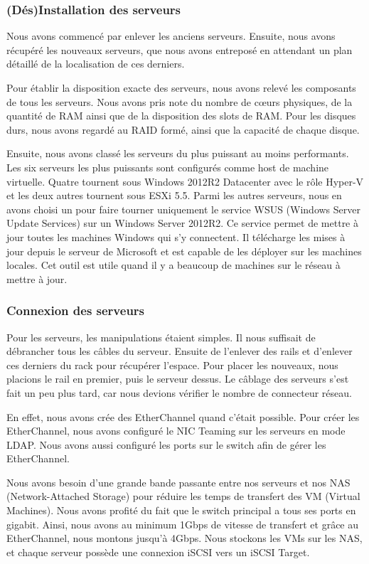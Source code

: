 \subsubsection{(Dés)Installation des serveurs}
Nous avons commencé par enlever les anciens serveurs.
Ensuite, nous avons récupéré les nouveaux serveurs, que nous avons entreposé en attendant un plan détaillé de la localisation de ces derniers.

Pour établir la disposition exacte des serveurs, nous avons relevé les composants de tous les serveurs.
Nous avons pris note du nombre de cœurs physiques, de la quantité de RAM ainsi que de la disposition des slots de RAM.
Pour les disques durs, nous avons regardé au RAID formé, ainsi que la capacité de chaque disque.

Ensuite, nous avons classé les serveurs du plus puissant au moins performants. 
Les six serveurs les plus puissants sont configurés comme host de machine virtuelle. 
Quatre tournent sous Windows 2012R2 Datacenter avec le rôle Hyper-V et les deux autres tournent sous ESXi 5.5.
Parmi les autres serveurs, nous en avons choisi un pour faire tourner uniquement le service WSUS (Windows Server Update Services) sur un Windows Server 2012R2. 
Ce service permet de mettre à jour toutes les machines Windows qui s'y connectent.
Il télécharge les mises à jour depuis le serveur de Microsoft et est capable de les déployer sur les machines locales.
Cet outil est utile quand il y a beaucoup de machines sur le réseau à mettre à jour. 

\subsubsection{Connexion des serveurs}
Pour les serveurs, les manipulations étaient simples. 
Il nous suffisait de débrancher tous les câbles du serveur.
Ensuite de l'enlever des rails et d'enlever ces derniers du rack pour récupérer l'espace.
Pour placer les nouveaux, nous placions le rail en premier, puis le serveur dessus.
Le câblage des serveurs s'est fait un peu plus tard, car nous devions vérifier le nombre de connecteur réseau. 

En effet, nous avons crée des EtherChannel quand c'était possible.
Pour créer les EtherChannel, nous avons configuré le NIC Teaming sur les serveurs en mode LDAP.
Nous avons aussi configuré les ports sur le switch afin de gérer les EtherChannel.
 
Nous avons besoin d'une grande bande passante entre nos serveurs et nos NAS (Network-Attached Storage) pour réduire les temps de transfert des VM (Virtual Machines).
Nous avons profité du fait que le switch principal a tous ses ports en gigabit. 
Ainsi, nous avons au minimum 1Gbps de vitesse de transfert et grâce au EtherChannel, nous montons jusqu'à 4Gbps.
Nous stockons les VMs sur les NAS, et chaque serveur possède une connexion iSCSI vers un iSCSI Target. 

